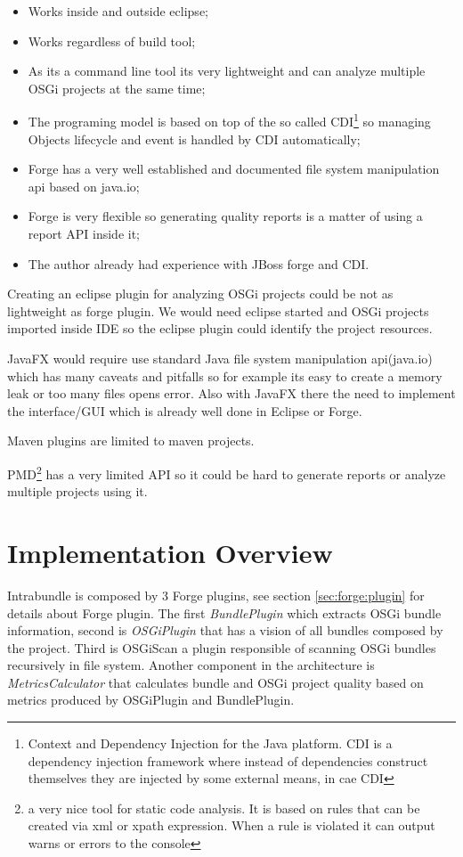 \begin{itemize}
\item Works inside and outside eclipse;
\item Works regardless of build tool;
\item As its a command line tool its very lightweight and can analyze multiple OSGi projects at the same time;
\item The programing model is based on top of the so called CDI\footnote{Context and Dependency Injection for the Java platform. CDI is a dependency injection framework where instead of dependencies construct themselves they are injected by some external means, in cae CDI} so managing Objects lifecycle and event is handled by CDI automatically;
\item Forge has a very well established and documented file system manipulation api based on java.io;
\item Forge is very flexible so generating quality reports is a matter of using a report API inside it;  
\item The author already had experience with JBoss forge and CDI. 
\end{itemize}

Creating an eclipse plugin for analyzing OSGi projects could be not as lightweight as forge plugin. We would need eclipse started and OSGi projects imported inside IDE so the eclipse plugin could identify the project resources.

JavaFX would require use standard Java file system manipulation api(java.io) which has many caveats and pitfalls so for example its easy to create a memory leak or too many files opens error. Also with JavaFX there the need to implement the interface/GUI which is already well done in Eclipse or Forge.

Maven plugins are limited to maven projects.

PMD\footnote{a very nice tool for static code analysis. It is based on rules that can be created via xml or xpath expression. When a rule is violated it can output warns or errors to the console} has a very limited API so it could be hard to generate reports or analyze multiple projects using it. 


\section{Implementation Overview}

Intrabundle is composed by 3 Forge plugins, see section \ref{sec:forge:plugin} for details about Forge plugin. The first \emph{BundlePlugin} which extracts OSGi bundle information, second is \emph{OSGiPlugin} that has a vision of all bundles composed by the project. Third is OSGiScan a plugin responsible of scanning OSGi bundles recursively in file system. Another component in the architecture is \emph{MetricsCalculator} that calculates bundle and OSGi project quality based on metrics produced by OSGiPlugin and BundlePlugin.

